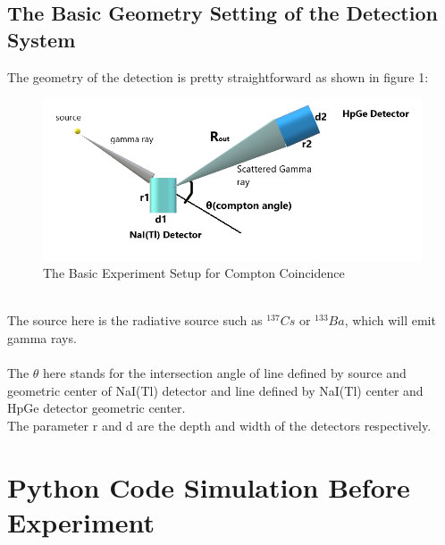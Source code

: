 \documentclass[12pt]{article}
\begin{document}
	\subsection{The Basic Geometry Setting of the Detection System}
	The geometry of the detection is pretty straightforward as shown in figure 1:\\
	\begin{figure}[h]
		\centering
		\includegraphics[width=0.7\linewidth]{pic/Basic_Geo_sys}
		\caption{The Basic Experiment Setup for Compton Coincidence}
		\label{fig:basicgeosys}
	\end{figure}\\
	The source here is the radiative source such as $^{137}Cs$ or $^{133}Ba$, which will emit gamma rays.\\	\\
	The $\theta$ here stands for the intersection angle of line defined by source and geometric center of NaI(Tl) detector and line defined by NaI(Tl) center and HpGe detector geometric center.\\
	The parameter r and d are the depth and width of the detectors respectively.
	\section{Python Code Simulation Before Experiment}
\end{document}
